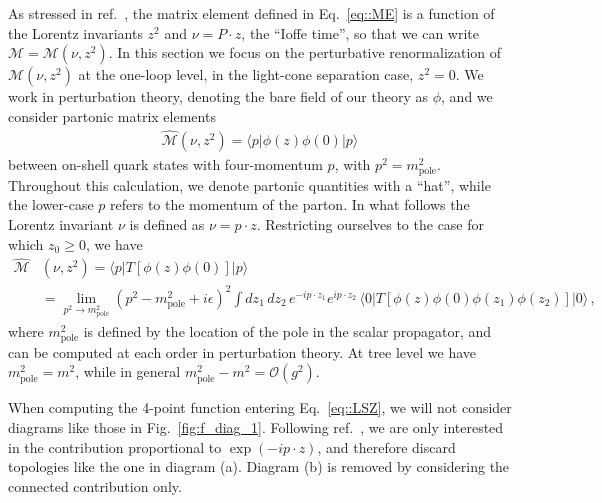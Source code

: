 As stressed in ref.~\cite{Radyushkin:2017cyf}, the matrix element defined in
Eq.~\eqref{eq::ME} is a function of the Lorentz invariants $z^2$ and $\nu =
P\cdot z$, the ``Ioffe time'', so that we can write
$\mathcal{M}=\mathcal{M}\left(\nu,z^2\right)$. In this section we focus on the
perturbative renormalization of $\mathcal{M}\left(\nu,z^2\right)$ at the
one-loop level, in the light-cone separation case, $z^2=0$. 
%
We work in perturbation theory, denoting the bare field of our theory as $\phi$,
and we consider partonic matrix elements
\begin{align}
\label{eq::MEpartonic}
        \widehat{\mathcal{M}}\left(\nu,z^2\right) = \langle p | \phi\left(z\right)\phi\left(0\right)  | p \rangle
\end{align}
between on-shell quark states with four-momentum $p$, with $p^2 =
m_\mathrm{pole}^2$. Throughout this calculation, we denote partonic quantities
with a ``hat'', while the lower-case $p$ refers to the momentum of the parton.
In what follows the Lorentz invariant $\nu$ is defined as $\nu=p\cdot z$.
Restricting ourselves to the case for which $z_0 \geqslant 0 $, we have
\begin{align}
\label{eq::LSZ}
        \widehat{\mathcal{M}}&\left(\nu, z^2\right)=\langle p |T\left[\phi\left(z\right)\phi\left(0\right)\right]|p\rangle  \nonumber \\
        & = \lim_{p^2\rightarrow m^2_{\text{pole}}}\left(p^2-m^2_{\text{pole}} + i\epsilon\right)^2 
        \int dz_1\,dz_2 \,e^{-ip\cdot z_1}e^{ip\cdot z_2}\,
        \langle 0 | T\left[\phi\left(z\right)\phi\left(0\right)\phi\left(z_1\right)\phi\left(z_2\right)\right]|0\rangle\, ,
\end{align}
where $m_\mathrm{pole}^2$ is defined by the location of the pole in the scalar
propagator, and can be computed at each order in perturbation theory. At tree
level we have $m_\mathrm{pole}^2 = m^2$, while in general $m_\mathrm{pole}^2 - m^2 = \mathcal{O}\left(g^2\right)$.

When computing the 4-point function entering Eq.~\eqref{eq::LSZ}, we will not
consider diagrams like those in Fig.~\ref{fig:f_diag_1}. Following
ref.~\cite{Collins:1980ui}, we are only interested in the contribution
proportional to $\exp(-ip\cdot z)$, and therefore discard topologies like the
one in diagram (a). Diagram (b) is removed by considering the connected
contribution only. 

\setlength{\feynhanddotsize}{1.3truemm}

